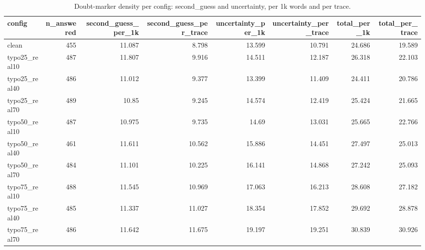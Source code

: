 \documentclass[11pt]{article}
\begin{document}
\begin{table}[H]
\centering
\caption{Doubt-marker density per config: second\_guess and uncertainty, per 1k words and per trace.}
\small
\begin{adjustbox}{max width=\textwidth}
\begin{tabular}{lrrrrrrr}
\toprule
\textbf{config} & \textbf{n\_answered} & \textbf{second\_guess\_per\_1k} & \textbf{second\_guess\_per\_trace} & \textbf{uncertainty\_per\_1k} & \textbf{uncertainty\_per\_trace} & \textbf{total\_per\_1k} & \textbf{total\_per\_trace} \\
\midrule
clean & 455 & 11.087 & 8.798 & 13.599 & 10.791 & 24.686 & 19.589 \\
typo25\_real10 & 487 & 11.807 & 9.916 & 14.511 & 12.187 & 26.318 & 22.103 \\
typo25\_real40 & 486 & 11.012 & 9.377 & 13.399 & 11.409 & 24.411 & 20.786 \\
typo25\_real70 & 489 & 10.85 & 9.245 & 14.574 & 12.419 & 25.424 & 21.665 \\
typo50\_real10 & 487 & 10.975 & 9.735 & 14.69 & 13.031 & 25.665 & 22.766 \\
typo50\_real40 & 461 & 11.611 & 10.562 & 15.886 & 14.451 & 27.497 & 25.013 \\
typo50\_real70 & 484 & 11.101 & 10.225 & 16.141 & 14.868 & 27.242 & 25.093 \\
typo75\_real10 & 488 & 11.545 & 10.969 & 17.063 & 16.213 & 28.608 & 27.182 \\
typo75\_real40 & 485 & 11.337 & 11.027 & 18.354 & 17.852 & 29.692 & 28.878 \\
typo75\_real70 & 486 & 11.642 & 11.675 & 19.197 & 19.251 & 30.839 & 30.926 \\
\bottomrule
\end{tabular}
\end{adjustbox}
\end{table}
\end{document}
